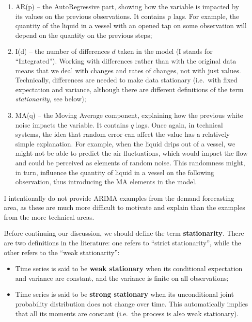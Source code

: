 \documentclass[
]{book}
\providecommand{\tightlist}{%
  \setlength{\itemsep}{0pt}\setlength{\parskip}{0pt}}
\theoremstyle{definition}
\theoremstyle{definition}
\theoremstyle{definition}
\theoremstyle{definition}
\theoremstyle{remark}
\begin{document}
\begin{enumerate}
\def\labelenumi{\arabic{enumi}.}
\tightlist
\item
  AR(p) -- the AutoRegressive part, showing how the variable is impacted by its values on the previous observations. It contains \(p\) lags. For example, the quantity of the liquid in a vessel with an opened tap on some observation will depend on the quantity on the previous steps;
\item
  I(d) -- the number of differences \(d\) taken in the model (I stands for ``Integrated''). Working with differences rather than with the original data means that we deal with changes and rates of changes, not with just values. Technically, differences are needed to make data stationary (i.e.~with fixed expectation and variance, although there are different definitions of the term \emph{stationarity}, see below);
\item
  MA(q) -- the Moving Average component, explaining how the previous white noise impacts the variable. It contains \(q\) lags. Once again, in technical systems, the idea that random error can affect the value has a relatively simple explanation. For example, when the liquid drips out of a vessel, we might not be able to predict the air fluctuations, which would impact the flow and could be perceived as elements of random noise. This randomness might, in turn, influence the quantity of liquid in a vessel on the following observation, thus introducing the MA elements in the model.
\end{enumerate}

I intentionally do not provide ARIMA examples from the demand forecasting area, as these are much more difficult to motivate and explain than the examples from the more technical areas.

Before continuing our discussion, we should define the term \textbf{stationarity}. There are two definitions in the literature: one refers to ``strict stationarity'', while the other refers to the ``weak stationarity'':

\begin{itemize}
\tightlist
\item
  Time series is said to be \textbf{weak stationary} when its conditional expectation and variance are constant, and the variance is finite on all observations;
\item
  Time series is said to be \textbf{strong stationary} when its unconditional joint probability distribution does not change over time. This automatically implies that all its moments are constant (i.e.~the process is also weak stationary).
\end{itemize}
\end{document}
